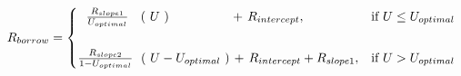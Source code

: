 \documentclass[preview]{standalone}
\begin{document}
\begin{align*}
R_{borrow} =\begin{cases} \ \ \frac{R_{slope1}}{U_{optimal}}\ \ \hspace{0.1cm} (\ U \ )\ \ \ \ \ \ \ \ \ \ \ \ \ \  \hspace{0.05cm}+ \hspace{0.05cm}R_{intercept}, & \text{if } U \leq U_{optimal} \\\\[0.3em] \frac{R_{slope2}}{1-U_{optimal}}\ \hspace{0.1cm} (\ U-U_{optimal}\ ) \hspace{0.05cm}+ \hspace{0.05cm}R_{intercept} + R_{slope1}, & \text{if } U > U_{optimal} \end{cases}
\end{align*}
\end{document}
